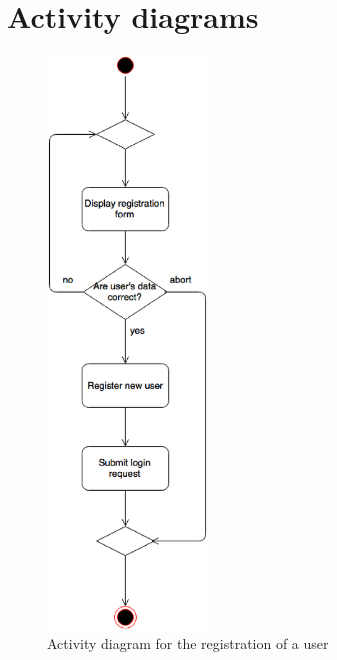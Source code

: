 \newpage
\section{Activity diagrams}

\begin{figure}[h]
	\centering
	\includegraphics[height=15.2cm,keepaspectratio]{figures/registration_activity_diagram.eps}
	\caption{Activity diagram for the registration of a user}
	\label{fig:registration_activity_diagram}
\end{figure}

